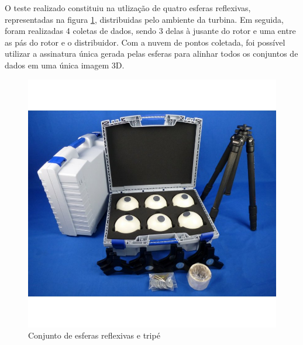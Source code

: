 % 
% 
% 

O teste realizado constituiu na utlização de quatro esferas reflexivas,
representadas na figura \ref{fig::esferas}, distribuidas pelo ambiente da
turbina.
Em seguida, foram realizadas 4 coletas de dados, sendo 3 delas à jusante do
rotor e uma entre as pás do rotor e o distribuidor. Com a nuvem de pontos
coletada, foi possível utilizar a assinatura única gerada pelas esferas para
alinhar todos os conjuntos de dados em uma única imagem 3D.

\begin{figure}[h!]
\centering
	\includegraphics[width=0.9\columnwidth]{figs/3dsensors/kit}
	\caption{Conjunto de esferas reflexivas e tripé}
	\label{fig::esferas}
\end{figure}

